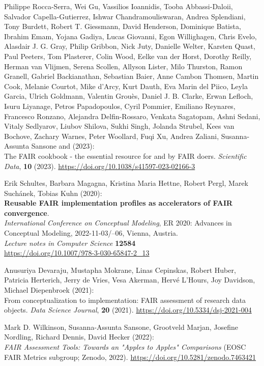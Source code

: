 \begin{thebibliography}{9}
Philippe Rocca-Serra, Wei Gu, Vassilios Ioannidis, Tooba Abbassi-Daloii,
Salvador Capella-Gutierrez, Ishwar Chandramouliswaran, Andrea
Splendiani, Tony Burdett, Robert T. Giessmann, David Henderson,
Dominique Batista, Ibrahim Emam, Yojana Gadiya, Lucas Giovanni, Egon
Willighagen, Chris Evelo, Alasdair J. G. Gray, Philip Gribbon, Nick
Juty, Danielle Welter, Karsten Quast, Paul Peeters, Tom Plasterer, Colin
Wood, Eelke van der Horst, Dorothy Reilly, Herman van Vlijmen, Serena
Scollen, Allyson Lister, Milo Thurston, Ramon Granell, Gabriel
Backianathan, Sebastian Baier, Anne Cambon Thomsen, Martin Cook, Melanie
Courtot, Mike d'Arcy, Kurt Dauth, Eva Marin del Piico, Leyla Garcia,
Ulrich Goldmann, Valentin Grouès, Daniel J. B. Clarke, Erwan Lefloch,
Isuru Liyanage, Petros Papadopoulos, Cyril Pommier, Emiliano Reynares,
Francesco Ronzano, Alejandra Delfin-Rossaro, Venkata Sagatopam, Ashni
Sedani, Vitaly Sedlyarov, Liubov Shilova, Sukhi Singh, Jolanda Strubel,
Kees van Bochove, Zachary Warnes, Peter Woollard, Fuqi Xu, Andrea
Zaliani, Susanna-Assunta Sansone and (2023): \\
The {FAIR} cookbook -
the essential resource for and by {FAIR} doers. \emph{Scientific Data},
\textbf{10} (2023).
\url{https://doi.org/10.1038/s41597-023-02166-3}

Erik Schultes, Barbara Magagna, Kristina Maria Hettne, Robert Pergl,
Marek Suchánek, Tobias Kuhn (2020): \\
\textbf{Reusable {FAIR} implementation profiles as accelerators of {FAIR} convergence}.\\
\emph{International Conference on Conceptual Modeling}, ER 2020: Advances in Conceptual Modeling, 2022-11-03/--06, Vienna, Austria. \\
\emph{Lecture notes in Computer Science} \textbf{12584} \\ 
\url{https://doi.org/10.1007/978-3-030-65847-2_13}

Anusuriya Devaraju, Mustapha Mokrane, Linas Cepinskas, Robert Huber,
Patricia Herterich, Jerry de Vries, Vesa Akerman, Hervé L'Hours, Joy
Davidson, Michael Diepenbroek (2021): \\
From conceptualization to
implementation: {FAIR} assessment of research data objects. \emph{Data
Science Journal}, \textbf{20} (2021).
\url{https://doi.org/10.5334/dsj-2021-004}

Mark D. Wilkinson, Susanna-Assunta Sansone, Grootveld Marjan, Josefine
Nordling, Richard Dennis, David Hecker (2022): \\
\emph{{FAIR Assessment
Tools: Towards an "Apples to Apples" Comparisons}} ({EOSC} {FAIR}
Metrics subgroup; Zenodo, 2022).
\url{https://doi.org/10.5281/zenodo.7463421}


\end{thebibliography}
